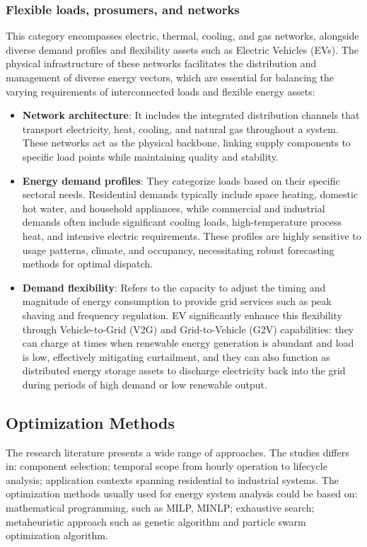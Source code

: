 \documentclass[12pt,a4paper]{report}
\begin{document}
\subsubsection{Flexible loads, prosumers, and networks}

This category encompasses electric, thermal, cooling, and gas networks, alongside diverse demand profiles and flexibility assets such as Electric Vehicles (EVs). The physical infrastructure of these networks facilitates the distribution and management of diverse energy vectors, which are essential for balancing the varying requirements of interconnected loads and flexible energy assets:

\begin{itemize}
    \item \textbf{Network architecture}: It includes the integrated distribution channels that transport electricity, heat, cooling, and natural gas throughout a system. These networks act as the physical backbone, linking supply components to specific load points while maintaining quality and stability.
    \item \textbf{Energy demand profiles}: They categorize loads based on their specific sectoral needs. Residential demands typically include space heating, domestic hot water, and household appliances, while commercial and industrial demands often include significant cooling loads, high-temperature process heat, and intensive electric requirements. 
    These profiles are highly sensitive to usage patterns, climate, and occupancy, necessitating robust forecasting methods for optimal dispatch. 
   \item \textbf{Demand flexibility}: Refers to the capacity to adjust the timing and magnitude of energy consumption to provide grid services such as peak shaving and frequency regulation. EV significantly enhance this flexibility through Vehicle-to-Grid (V2G) and Grid-to-Vehicle (G2V) capabilities: they can charge at times when renewable energy generation is abundant and load is low, effectively mitigating curtailment, and they can also function as distributed energy storage assets to discharge electricity back into the grid during periods of high demand or low renewable output.
\end{itemize}

\subsection{Optimization Methods}
The research literature presents a wide range of approaches. The studies differs in: component selection; temporal scope from hourly operation to lifecycle analysis; application contexts spanning residential to industrial systems. The optimization methods usually used for energy system analysis could be based on: mathematical programming, such as MILP, MINLP; exhaustive search; metaheuristic approach such as genetic algorithm and particle swarm optimization algorithm. 
\end{document}
